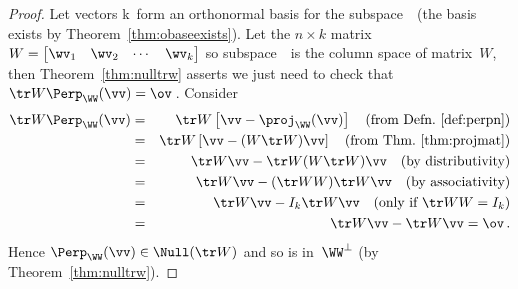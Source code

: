 \begin{proof} 
Let vectors \hlist\wv k\ form an orthonormal basis for the subspace~\WW\ (the basis exists by Theorem~\ref{thm:obaseexists}).
Let the \(n\times k\) matrix \(W=\begin{bmatrix} \wv_1&\wv_2&\cdots&\wv_k \end{bmatrix}\) so subspace~\WW\ is the column space of matrix~\(W\), then Theorem~\ref{thm:nulltrw} asserts we just need to check that \(\tr W\Perp_\WW(\vv)=\ov\)\,.
Consider 
\begin{eqnarray*}
\tr W\Perp_\WW(\vv)
&=&\tr W\left[\vv-\proj_\WW(\vv)\right]
\quad(\text{from Defn.~\ref{def:perpn}})
\\&=&\tr W\left[\vv-(W\tr W)\vv\right]
\quad(\text{from Thm.~\ref{thm:projmat}})
\\&=&\tr W\vv-\tr W(W\tr W)\vv
\quad(\text{by distributivity})
\\&=&\tr W\vv-(\tr WW)\tr W\vv 
\quad(\text{by associativity})
\\&=&\tr W\vv-I_k\tr W\vv 
\quad(\text{only if }\tr WW=I_k)
\\&=&\tr W\vv-\tr W\vv =\ov\,.
\end{eqnarray*}
Hence \(\Perp_\WW(\vv)\in\Null(\tr W)\) and so is in~\(\WW^\perp\) (by Theorem~\ref{thm:nulltrw}).


\end{proof}

